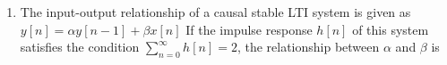 \documentclass[journal,12pt,twocolumn]{IEEEtran}
\begin{document}
\begin{enumerate}
%
%
%




\item The input-output relationship of a causal stable LTI system is given as $y[n]=\alpha y[n-1]+\beta x[n]$ \newline If the impulse response $h[n]$ of this system satisfies the condition $\sum_{n=0}^{\infty}h[n]=2$, the relationship between $\alpha$ and $\beta$ is
\begin{enumerate}[(A)]

\end{enumerate}


%
%



\end{enumerate}
\end{document}
